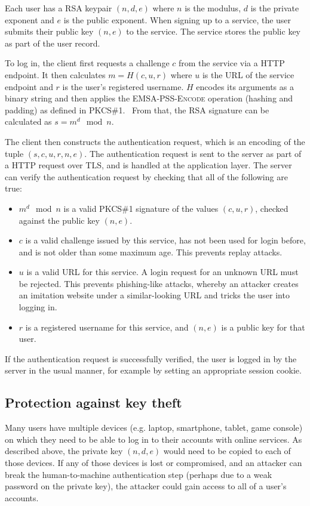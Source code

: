 Each user has a RSA keypair $(n, d, e)$ where $n$ is the modulus, $d$ is the private exponent and
$e$ is the public exponent. When signing up to a service, the user submits their public key
$(n, e)$ to the service. The service stores the public key as part of the user record.

To log in, the client first requests a challenge $c$ from the service via a HTTP endpoint. It then
calculates $m = H(c, u, r)$ where $u$ is the URL of the service endpoint and $r$ is the user's
registered username. $H$ encodes its arguments as a binary string and then applies the
\textsc{EMSA-PSS-Encode} operation (hashing and padding) as defined in PKCS\#1.~\cite{PKCS1} From
that, the RSA signature can be calculated as $s = m^d \mod n$.

The client then constructs the authentication request, which is an encoding of the tuple
$(s, c, u, r, n, e)$. The authentication request is sent to the server as part of a HTTP request
over TLS, and is handled at the application layer. The server can verify the authentication request
by checking that all of the following are true:
\begin{itemize}
\item $m^d \mod n$ is a valid PKCS\#1 signature of the values $(c, u, r)$, checked against the
public key $(n, e)$.
\item $c$ is a valid challenge issued by this service, has not been used for login before, and is
not older than some maximum age. This prevents replay attacks.
\item $u$ is a valid URL for this service. A login request for an unknown URL must be rejected.
This prevents phishing-like attacks, whereby an attacker creates an imitation website under a
similar-looking URL and tricks the user into logging in.
\item $r$ is a registered username for this service, and $(n, e)$ is a public key for that user.
\end{itemize}
If the authentication request is successfully verified, the user is logged in by the server in the
usual manner, for example by setting an appropriate session cookie.

\subsection{Protection against key theft}

Many users have multiple devices (e.g. laptop, smartphone, tablet, game console) on which they need
to be able to log in to their accounts with online services. As described above, the private key
$(n, d, e)$ would need to be copied to each of those devices. If any of those devices is lost or
compromised, and an attacker can break the human-to-machine authentication step (perhaps due to a
weak password on the private key), the attacker could gain access to all of a user's accounts.

